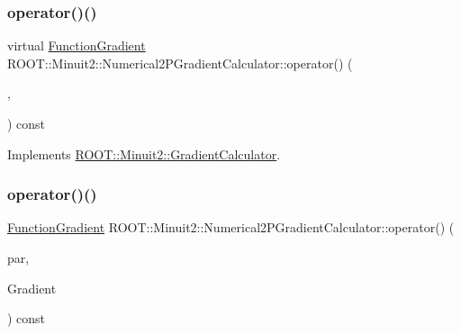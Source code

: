 \subsubsection{\texorpdfstring{operator()()}{operator()()}\hspace{0.1cm}{\footnotesize\ttfamily [5/6]}}
{\footnotesize\ttfamily virtual \mbox{\hyperlink{classROOT_1_1Minuit2_1_1FunctionGradient}{Function\+Gradient}} R\+O\+O\+T\+::\+Minuit2\+::\+Numerical2\+P\+Gradient\+Calculator\+::operator() (\begin{DoxyParamCaption}\item[{const \mbox{\hyperlink{classROOT_1_1Minuit2_1_1MinimumParameters}{Minimum\+Parameters}} \&}]{,  }\item[{const \mbox{\hyperlink{classROOT_1_1Minuit2_1_1FunctionGradient}{Function\+Gradient}} \&}]{ }\end{DoxyParamCaption}) const\hspace{0.3cm}{\ttfamily [virtual]}}



Implements \mbox{\hyperlink{classROOT_1_1Minuit2_1_1GradientCalculator_a1809c1e8a89d32aabf7835e9690c2916}{R\+O\+O\+T\+::\+Minuit2\+::\+Gradient\+Calculator}}.

\mbox{\label{classROOT_1_1Minuit2_1_1Numerical2PGradientCalculator_a89c825ba34455277290940fa62fc5321}} 
\subsubsection{\texorpdfstring{operator()()}{operator()()}\hspace{0.1cm}{\footnotesize\ttfamily [6/6]}}
{\footnotesize\ttfamily \mbox{\hyperlink{classROOT_1_1Minuit2_1_1FunctionGradient}{Function\+Gradient}} R\+O\+O\+T\+::\+Minuit2\+::\+Numerical2\+P\+Gradient\+Calculator\+::operator() (\begin{DoxyParamCaption}\item[{const \mbox{\hyperlink{classROOT_1_1Minuit2_1_1MinimumParameters}{Minimum\+Parameters}} \&}]{par,  }\item[{const \mbox{\hyperlink{classROOT_1_1Minuit2_1_1FunctionGradient}{Function\+Gradient}} \&}]{Gradient }\end{DoxyParamCaption}) const\hspace{0.3cm}{\ttfamily [virtual]}}



